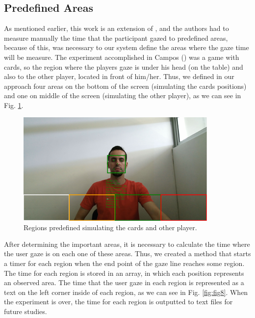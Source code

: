\documentclass[10pt, conference]{IEEEtran}
\begin{document}
\subsection{Predefined Areas}

	As mentioned earlier, this work is an extension of \cite{6}, and the authors had to measure manually the time that the participant gazed to predefined areas, because of this, was necessary to our system define the areas where the gaze time will be measure. 
	The experiment accomplished in Campos (\cite{6}) was a game with cards, so the region where the players gaze is under his head (on the table) and also to the other player, located in front of him/her. 
	Thus, we defined in our approach four areas on the bottom of the screen (simulating the cards positions) and one on middle of the screen (simulating the other player), as we can see in Fig. \ref{fig:fig7}.

  \begin{figure}[t]
      \centering
      \includegraphics{figures/pic7.png}
      \caption{Regions predefined simulating the cards and other player.}
      \label{fig:fig7}
  \end{figure}

	After determining the important areas, it is necessary to calculate the time where the user gaze is on each one of these areas. 
	Thus, we created a method that starts a timer for each region when the end point of the gaze line reaches some region. 
	The time for each region is stored in an array, in which each position represents an observed area. 
	The time that the user gaze in each region is represented as a text on the left corner inside of each region, as we can see in Fig. \ref{fig:fig8}. 
	When the experiment is over, the time for each region is outputted to text files for future studies.
\end{document}
